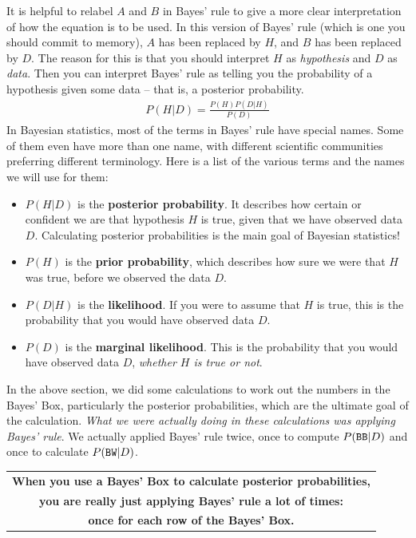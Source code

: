 It is helpful to relabel $A$ and $B$ in Bayes' rule to give a more clear
interpretation of how the equation is to be used. In this version of Bayes'
rule (which is one you should commit to memory), $A$ has been replaced by $H$,
and $B$ has been replaced by $D$. The reason for this is that you should
interpret $H$ as {\it hypothesis} and $D$ as {\it data}. Then you can interpret
Bayes' rule as telling you the probability of a hypothesis given some data --
that is, a posterior probability.
\begin{eqnarray}
P(H|D) = \frac{P(H)P(D|H)}{P(D)}
\end{eqnarray}
In Bayesian statistics, most of the terms in Bayes' rule have special names.
Some of them even have more than one name, with different scientific
communities preferring different terminology. Here is a list of the
various terms and the names we will use for them:
\begin{itemize}
\item $P(H|D)$ is the {\bf posterior probability}. It describes how certain
or confident we are that
hypothesis $H$ is true, given that we have observed data $D$. Calculating
posterior probabilities is the main goal of Bayesian statistics!
\item $P(H)$ is the {\bf prior probability}, which describes how sure we were
that $H$ was true, before we observed the data $D$.
\item $P(D|H)$ is the {\bf likelihood}. If you were to assume that $H$ is true,
this is the probability that you would have observed data $D$.
\item $P(D)$ is the {\bf marginal likelihood}. This is the probability that you
would have observed data $D$, {\it whether $H$ is true or not}.
\end{itemize}

In the above section, we did some calculations to work out the numbers in the
Bayes' Box, particularly the posterior probabilities, which are the ultimate
goal of the calculation. {\it What we were actually doing in these calculations
was applying Bayes' rule}. We actually applied Bayes' rule twice, once to
compute $P(\texttt{BB} | D)$ and once to calculate $P(\texttt{BW} | D)$.


\begin{center}
\begin{tabular}{|c|}
\hline
{\bf When you use a Bayes' Box to calculate posterior probabilities,}\\
{\bf you are really just applying Bayes' rule a lot of times:}\\
{\bf once for each row of the Bayes' Box.}\\
\hline
\end{tabular}
\end{center}

